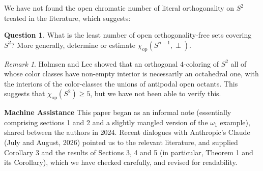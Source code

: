 \documentclass[12pt]{article}
\newcommand{\chiop}{\chi_{\mathrm{op}}}
\theoremstyle{plain}
\theoremstyle{definition}
\newtheorem{question}{Question}
\theoremstyle{remark}
\newtheorem{remark}{Remark}
\begin{document}
We have not found the open chromatic number of literal orthogonality on $S^2$ treated in the literature, 
which suggests:

\begin{question}\label{sphereq}
What is the least number of open orthogonality-free sets covering $S^2$? More generally, determine or estimate $\chiop(S^{n-1}, \perp)$.\\
\end{question}

\begin{remark} Holmsen and Lee \cite{HL} showed that an orthogonal $4$-coloring of $S^2$ all of whose  color classes have non-empty interior is necessarily an  octahedral one, with the interiors of the color-classes the unions of antipodal open octants. This suggests that $\chiop(S^2) \geq 5$, but we have not been able to verify this. 
\end{remark} 

{\bf Machine Assistance} This paper began as an informal note (essentially comprising sections 1 and 2 and a slightly mangled version of the $\omega_1$ example), shared between the authors in 2024. Recent dialogues with  Anthropic's Claude (July and August, 2026) pointed us to the relevant literature, and supplied Corollary 3 and the results of Sections 3, 4 and 5 (in particular, Theorem 1 and its Corollary), which we have checked carefully, and revised for readability.
\end{document}
